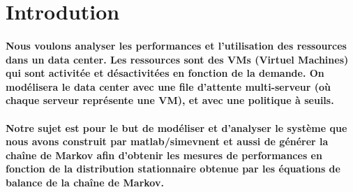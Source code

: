 \section{Introdution}
\paragraph{Nous voulons analyser les performances et l'utilisation des ressources dans un data center. Les ressources sont des VMs (Virtuel Machines) qui sont activitée et désactivitées en fonction de la demande. On modélisera le data center avec une file d'attente multi-serveur (où chaque serveur représente une VM), et avec une politique à seuils. }

\paragraph{Notre sujet est pour le but de modéliser et d'analyser le système que nous avons construit par matlab/simevnent et aussi de générer la chaîne de Markov afin d'obtenir les mesures de performances en fonction de la distribution stationnaire obtenue par les équations de balance de la chaîne de Markov.}





